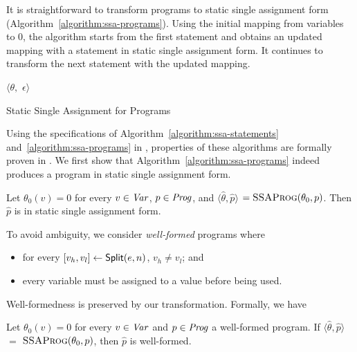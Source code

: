It is straightforward to transform programs to static single
assignment form (Algorithm~\ref{algorithm:ssa-programs}). Using the
initial mapping from variables to $0$, 
the algorithm starts from the first statement and obtains an
updated mapping with a statement in static single assignment form. It
continues to transform the next statement with the updated mapping. 

\begin{algorithm}
  \begin{algorithmic}[1]
      \Case{$\epsilon$}
        \Return $\langle \theta,$ $\epsilon \rangle$
      \EndCase
      \EndCase
    \EndMatch
    \EndFunction
  \end{algorithmic}
  \caption{Static Single Assignment for Programs}
  \label{algorithm:ssa-programs}
\end{algorithm}

Using the specifications of Algorithm~\ref{algorithm:ssa-statements}
and~\ref{algorithm:ssa-programs} in \gallina, properties of these
algorithms are formally proven in \coq. We first show that
Algorithm~\ref{algorithm:ssa-programs} indeed 
produces a program in static single assignment form.
\begin{lemma}
  Let $\theta_0(v) = 0$ for every $v \in \mathit{Var}$, $p \in \mathit{Prog}$, and
  $\langle \hat{\theta}, \hat{p} \rangle$ $=
  \textsc{SSAProg}(\theta_0, p)$. Then
  $\hat{p}$ is in static single assignment form.
\end{lemma}

To avoid ambiguity, we consider \emph{well-formed} programs where
\begin{itemize}
\item for every ${[}{v_h}, {v_l}{]} \leftarrow \mbox{\textsf{Split}}(e, n)$, $v_h
  \neq v_l$; and
\item every variable must be assigned to a value before being used.
\end{itemize}
Well-formedness is preserved by our transformation. Formally, we have
\begin{lemma}
  Let $\theta_0(v) = 0$ for every $v \in \mathit{Var}$ and $p \in \mathit{Prog}$ a
  well-formed program. If $\langle \hat{\theta}, \hat{p} \rangle$ $=$ 
  $\textsc{SSAProg}(\theta_0, p)$, then $\hat{p}$ is well-formed.
\end{lemma}

